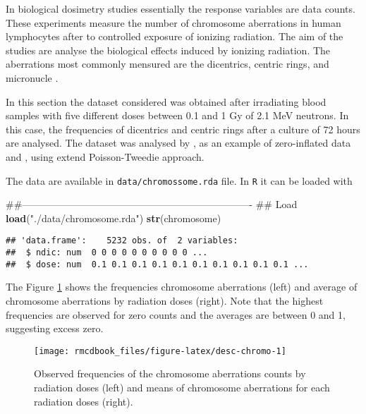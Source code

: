 \documentclass[9pt,a5paper,]{book}
\newenvironment{Shaded}{}{}
\newcommand{\KeywordTok}[1]{\textbf{{#1}}}
\newcommand{\StringTok}[1]{{#1}}
\newcommand{\NormalTok}[1]{{#1}}
\renewenvironment{Shaded}{\color{inputcolor}}{}
\theoremstyle{definition}
\theoremstyle{definition}
\theoremstyle{remark}
\begin{document}
In biological dosimetry studies essentially the response variables are
data counts. These experiments measure the number of chromosome
aberrations in human lymphocytes after to controlled exposure of
ionizing radiation. The aim of the studies are analyse the biological
effects induced by ionizing radiation. The aberrations most commonly
mensured are the dicentrics, centric rings, and micronucle .

In this section the dataset considered was obtained after irradiating
blood samples with five different doses between 0.1 and 1 Gy of 2.1 MeV
neutrons. In this case, the frequencies of dicentrics and centric rings
after a culture of 72 hours are analysed. The dataset was analysed by
\citet{Oliveira2006}, as an example of zero-inflated data and
\citet{Bonat2016b}, using extend Poisson-Tweedie approach.

The data are available in \texttt{data/chromossome.rda} file. In
\texttt{R} it can be loaded with

\begin{Shaded}
\begin{Highlighting}[]
\NormalTok{##----------------------------------------------------------------------}
\NormalTok{## Load}
\KeywordTok{load}\NormalTok{(}\StringTok{"./data/chromosome.rda"}\NormalTok{)}
\KeywordTok{str}\NormalTok{(chromosome)}
\end{Highlighting}
\end{Shaded}

\begin{verbatim}
## 'data.frame':    5232 obs. of  2 variables:
##  $ ndic: num  0 0 0 0 0 0 0 0 0 0 ...
##  $ dose: num  0.1 0.1 0.1 0.1 0.1 0.1 0.1 0.1 0.1 0.1 ...
\end{verbatim}

The Figure \ref{fig:desc-chromo} shows the frequencies chromosome
aberrations (left) and average of chromosome aberrations by radiation
doses (right). Note that the highest frequencies are observed for zero
counts and the averages are between 0 and 1, suggesting excess zero.

\begin{figure}[h]

{\centering \texttt{[image: rmcdbook\_files/figure-latex/desc-chromo-1]} 

}

\caption{Observed frequencies of the chromosome aberrations counts by radiation doses (left) and means of chromosome aberrations for each radiation doses (right).}\label{fig:desc-chromo}
\end{figure}
\end{document}
